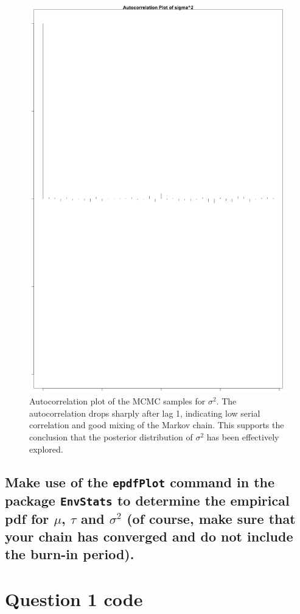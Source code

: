 \documentclass[]{article}
\begin{document}
\begin{figure}[H]
	\centering
	\includegraphics[width=0.7\linewidth]{img/img-autocorr-varpng}
    \caption{Autocorrelation plot of the MCMC samples for $\sigma^2$. The autocorrelation drops sharply after lag 1, indicating low serial correlation and good mixing of the Markov chain. This supports the conclusion that the posterior distribution of $\sigma^2$ has been effectively explored.}
	\label{fig:img-autocorr-varpng}
\end{figure}





\subsection{Make use of the \texttt{epdfPlot} command in the package \texttt{EnvStats} to determine the empirical pdf for $\mu$, $\tau$ and $\sigma^2$ (of course, make sure that your chain has converged and do not include the burn-in period).}





\appendix

\section{Question 1 code} \label{appendix:a}
\end{document}
